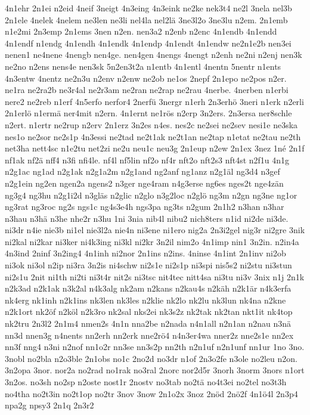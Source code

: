 {4n1ehr
2n1ei
n2eid
4neif
3neigt
4n3eing
4n3eink
ne2ke
nek3t4
ne2l
3nela
nel3b
2n1ele
4nelek
4nelem
ne3len
ne3li
nel4la
nel2lä
3ne3l2o
3ne3lu
n2em.
2n1emb
n1e2mi
2n3emp
2n1ems
3nen
n2en.
nen3a2
n2enb
n2enc
4n1endb
4n1endd
4n1endf
n1endg
4n1endh
4n1endk
4n1endp
4n1endt
4n1endw
ne2n1e2b
nen3ei
nenen1
ne4nene
4nengb
nen4ge.
nen4gen
4nengs
4nengt
n2enh
ne2ni
n2enj
nen3k
ne2no
n2ens
nens4e
nen3sk
5n2en3t2a
n1entb
4n1entl
4nentn
5nentr
n1ents
4n3entw
4nentz
ne2n3u
n2env
n2enw
ne2ob
ne1os
2nepf
2n1epo
ne2pos
n2er.
ne1ra
ne2ra2b
ne3r4al
ne2r3am
ne2ran
ne2rap
ne2rau
4nerbe.
4nerben
n1erbi
nere2
ne2reb
n1erf
4n5erfo
nerfor4
2nerfü
3nergr
n1erh
2n3erhö
3neri
n1erk
n2erli
2n1erlö
n1ermä
ner4mit
n2ern.
4n1ernt
ne1rös
n2erp
3n2ers.
2n3ersa
ner8schle
n2ert.
n1ertr
ne2rup
n2erv
2n1erz
3n2es
n4es.
nes2c
ne2sei
ne2sev
nesi1e
ne3ska
nes1o
ne2sor
ne2s1p
4n3essi
ne2tad
ne2t1ak
ne2t1an
ne2tap
n1etat
ne2tau
ne2th
net3ha
nett4sc
n1e2tu
net2zi
ne2u
neu1c
neu3g
2n1eup
n2ew
2n1ex
3nez
1né
2n1f
nf1ak
nf2ä
nff4
n3fi
nfi4le.
nf4l
nf5lin
nf2o
nf4r
nft2o
nft2s3
nft4st
n2f1u
4n1g
n2g1ac
ng1ad
n2g1ak
n2g1a2m
n2g1and
ng2anf
ng1anz
n2g1äl
ng3d4
n3gef
n2g1ein
ng2en
ngen2a
ngens2
n3ger
nge4ram
n4g3erse
ng6es
nges2t
nge4zän
ng3g4
ng3hu
n2g1i2d
n3gläs
n2glic
n2glo
n3g2loc
n2glö
ng3m
n2gn
ng3ne
ng1or
ng3rat
ng3roc
ng2s
ngs1c
ng4s3e4h
ngs3pa
ng3ts
n2gum
2n1h2
n3han
n3har
n3hau
n3hä
n3he
nhe2r
n3hu
1ni
3nia
nib4l
nibu2
nich8ters
n1id
ni2de
ni3de.
ni3dr
n4ie
nie3b
ni1el
nie3l2a
nie4n
ni3ene
ni1ero
nig2a
2n3i2gel
nig3r
ni2gre
3nik
ni2kal
ni2kar
ni3ker
ni4k3ing
ni3kl
ni2kr
3n2il
nim2o
4n1imp
nin1
3n2in.
n2in4a
4n3ind
2ninf
3n2ing4
4n1inh
ni2nor
2n1ins
n2ins.
4ninse
4n1int
2n1inv
ni2ob
ni3ok
ni3ol
n2ip
ni3ra
3n2is
ni4schw
ni2s1e
ni2s1p
ni3spi
nis5s2
ni2stu
ni3stun
ni2s1u
2nit
ni1th
ni2ti
ni3t4r
nit2s
ni3tsc
nit4tec
nitt4sa
ni3tu
ni3v
3nix
n1j
2n1k
n2k3ad
n2k1ak
n3k2al
n4k3alg
nk2am
n2kans
n2kau4s
n2käh
n2k1är
n4k3erfa
nk4erg
nk1inh
n2k1ins
nk3len
nk3les
n2klie
nk2lo
nk2lu
nk3lun
nk4na
n2kne
n2k1ort
nk2öf
n2köl
n2k3ro
nk2sal
nks2ei
nk3s2z
nk2tak
nk2tan
nkt1it
nk4top
nk2tru
2n3l2
2n1m4
nmen2s
4n1n
nna2be
n2nada
n4n1all
n2n1an
n2nau
n3nä
nn3d
nnen3g
n4nents
nn2erh
nn2erk
nne2rö4
n4n3er4wa
nner2z
nne2s1e
nn2ex
nn3f
nng4
n3ni
n2nof
nn1o2r
nn3se
nn3s2p
nn2th
n2n1uf
n2n1unf
nn1ur
1no
3no.
3nobl
no2bla
n2o3ble
2n1obs
no1c
2no2d
no3dr
n1of
2n3o2fe
n3ole
no2leu
n2on.
3n2opa
3nor.
nor2a
no2rad
no1rak
no3ral
2norc
nor2d5r
3norh
3norm
3nors
n1ort
3n2os.
no3sh
no2sp
n2oste
nost1r
2nostv
no3tab
no2tä
no4t3ei
no2tel
no3t3h
no4tha
no2t3in
no2t1op
no2tr
3nov
3now
2n1o2x
3noz
2nöd
2nö2f
4n1ö4l
2n3p4
npa2g
npsy3
2n1q
2n3r2
}
